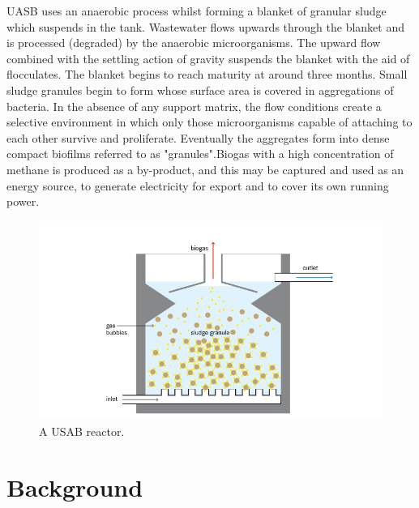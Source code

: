 UASB uses an anaerobic process whilst forming a blanket of granular sludge which suspends in the tank. Wastewater flows upwards through the blanket and is processed (degraded) by the anaerobic microorganisms. The upward flow combined with the settling action of gravity suspends the blanket with the aid of flocculates. The blanket begins to reach maturity at around three months. Small sludge granules begin to form whose surface area is covered in aggregations of bacteria. In the absence of any support matrix, the flow conditions create a selective environment in which only those microorganisms capable of attaching to each other survive and proliferate. Eventually the aggregates form into dense compact biofilms referred to as "granules".Biogas with a high concentration of methane is produced as a by-product, and this may be captured and used as an energy source, to generate electricity for export and to cover its own running power.

\begin{figure}[htbp]
\centering
\includegraphics[width=1.0\textwidth]{images/usab.png}
\caption{A USAB reactor.}
\label{fig:usab reactor}
\end{figure}

\section{Background}

